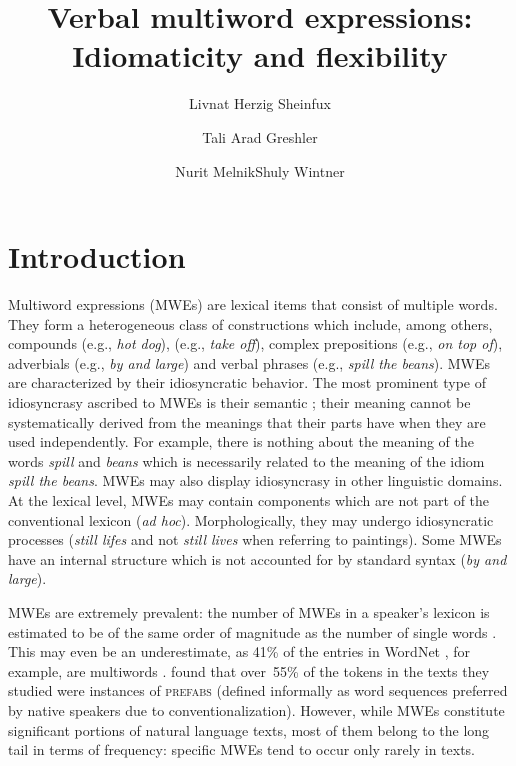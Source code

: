 \documentclass[output=paper]{langsci/langscibook}
\title{Verbal multiword expressions: Idiomaticity and flexibility}
\author{Livnat Herzig Sheinfux\affiliation{University of Haifa}\and Tali Arad Greshler\affiliation{University of Haifa}\and Nurit Melnik\affiliation{The Open University of Israel}\lastand Shuly Wintner\affiliation{University of Haifa}}
\begin{document}
\section{Introduction}
\label{she:sec:introduction}

Multiword expressions (MWEs) are lexical items that consist of
multiple words. They form a heterogeneous class of
constructions which include, among others, compounds (e.g., \textit{hot
  dog}),  (e.g., \textit{take off}), complex
prepositions (e.g., \textit{on top of}), adverbials (e.g., \textit{by and large})
and verbal phrases (e.g., \textit{spill the beans}). MWEs are characterized
by their idiosyncratic behavior. The most prominent type of
idiosyncrasy ascribed to MWEs is their semantic ; their
meaning cannot be systematically derived from the meanings that their
parts have when they are used independently.
For example, there is nothing about the meaning of the words \textit{spill} and \textit{beans} which is necessarily related to the meaning of the idiom \textit{spill the beans}.
MWEs may also display idiosyncrasy in other linguistic
domains. At the lexical level, MWEs may contain components which are
not part of the conventional lexicon (\textit{ad
  hoc}). Morphologically, they may undergo idiosyncratic processes
(\textit{still lifes} and not \textit{still lives} when referring to
paintings). Some MWEs have an internal structure which is not
accounted for by standard syntax (\textit{by and large}).

MWEs are extremely prevalent: the number of MWEs in a speaker's
lexicon is estimated to be of the same order of magnitude as the
number of single words \citep{jackendoff1997architecture}. This may even be an
underestimate, as 41\% of the entries in WordNet \citep{wordnet}, for
example, are multiwords \citep{sag02}.
\citet{erman:warren:2000} found that over~55\% of the tokens in the
texts they studied were instances of {\scshape prefabs} (defined
informally as word sequences preferred by native speakers due to
conventionalization).  However, while MWEs constitute significant
portions of natural language texts, most of them belong to the long
tail in terms of frequency: specific MWEs tend to occur only rarely in
texts.
\end{document}
